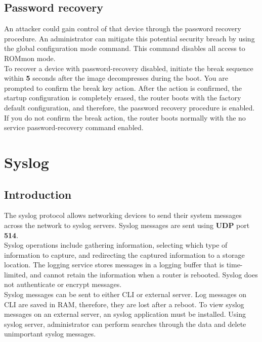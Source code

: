 \subsection{Password recovery}

An attacker could gain control of that device through the password recovery procedure. An administrator can mitigate this potential security breach by using the  global configuration mode command. This command disables all access to ROMmon mode. \\

To recover a device with password-recovery disabled, initiate the break sequence within \textbf{5} seconds after the image decompresses during the boot. You are prompted to confirm the break key action. After the action is confirmed, the startup configuration is completely erased, the router boots with the factory default configuration, and therefore, the password recovery procedure is enabled. If you do not confirm the break action, the router boots normally with the no service password-recovery command enabled.

\section{Syslog}

\subsection{Introduction}

The syslog protocol allows networking devices to send their system messages across the network to syslog servers. Syslog messages are sent using \textbf{UDP} port \textbf{514}.\\

Syslog operations include gathering information, selecting which type of information to capture, and redirecting the captured information to a storage location. The logging service stores messages in a logging buffer that is time-limited, and cannot retain the information when a router is rebooted. Syslog does not authenticate or encrypt messages.\\

Syslog messages can be sent to either CLI or external server. Log messages on CLI are saved in RAM, therefore, they are lost after a reboot. To view syslog messages on an external server, an syslog application must be installed. Using syslog server, administrator can perform searches through the data and delete unimportant syslog messages.

